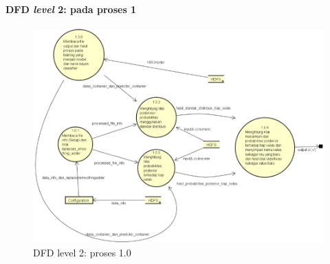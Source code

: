 \paragraph{DFD \textit{level} 2: pada proses 1}
\begin{figure}[H]
	\centering
	\includegraphics[scale=0.7]{Diagram/DFD_1_1_Testing_Map}
	\caption[DFD level 2: proses 1.0]{DFD level 2: proses 1.0}
	\label{fig:DFD level 2: proses 1.0}
\end{figure}

